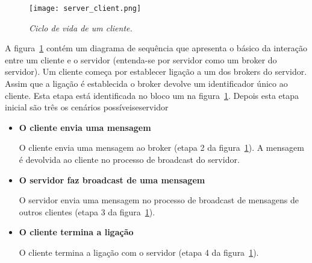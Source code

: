 \begin{figure}[H]
\centering
\texttt{[image: server\_client.png]}
\caption{\textit{Ciclo de vida de um cliente.}}
\label{fig:server-client}
\end{figure}

A figura~\ref{fig:server-client} contém um diagrama de sequência que apresenta o básico da interação entre um cliente e o servidor (entenda-se por servidor como um broker do servidor).
Um cliente começa por establecer ligação a um dos brokers do servidor. Assim que a ligação é establecida o broker devolve um identificador único ao cliente. Esta etapa está identificada no bloco um na figura~\ref{fig:server-client}. Depois esta etapa inicial são três os cenários possíveiseservidor

\begin{itemize}
\item
\textbf{O cliente envia uma mensagem}

O cliente envia uma mensagem ao broker (etapa 2 da figura~\ref{fig:server-client}). A mensagem é devolvida ao cliente no processo de broadcast do servidor.

\item
\textbf{O servidor faz broadcast de uma mensagem}

O servidor envia uma mensagem no processo de broadcast de mensagens de outros clientes (etapa 3 da figura~\ref{fig:server-client}).

\item
\textbf{O cliente termina a ligação}

O cliente termina a ligação com o servidor (etapa 4 da figura~\ref{fig:server-client}).
\end{itemize}
